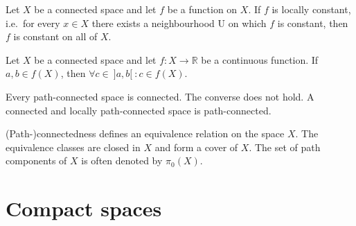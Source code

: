 
    \begin{property}
        Let $X$ be a connected space and let $f$ be a function on $X$. If $f$ is locally constant, i.e.~for every $x\in X$ there exists a neighbourhood U on which $f$ is constant, then $f$ is constant on all of $X$.
    \end{property}

    \begin{theorem}\label{topology:intermediate_value_theorem}
        Let $X$ be a connected space and let $f:X\rightarrow\mathbb{R}$ be a continuous function. If $a,b\in f(X)$, then $\forall c\in\ ]a,b[\ :c\in f(X)$.
    \end{theorem}


    \begin{property}
        Every path-connected space is connected. The converse does not hold. A connected and locally path-connected space is path-connected.
    \end{property}

    \begin{remark}\label{topology:connected_components}
        (Path-)connectedness defines an equivalence relation on the space $X$. The equivalence classes are closed in $X$ and form a cover of $X$. The set of path components of $X$ is often denoted by $\pi_0(X)$.
    \end{remark}

\section{Compact spaces}\label{section:compact}
